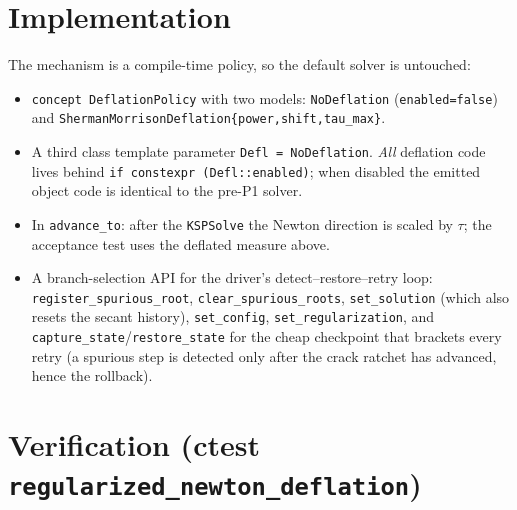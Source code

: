 \section{Implementation}

The mechanism is a compile-time policy, so the default solver is
untouched:
%
\begin{itemize}
  \item \texttt{concept DeflationPolicy} with two models: \texttt{NoDeflation}
        (\texttt{enabled=false}) and
        \texttt{ShermanMorrisonDeflation\{power,shift,tau\_max\}}.
  \item A third class template parameter
        \texttt{Defl = NoDeflation}. \emph{All} deflation code lives
        behind \texttt{if constexpr (Defl::enabled)}; when disabled the
        emitted object code is identical to the pre-P1 solver.
  \item In \texttt{advance\_to}: after the \texttt{KSPSolve} the Newton
        direction is scaled by \(\tau\); the acceptance test uses the
        deflated measure above.
  \item A branch-selection API for the driver's detect--restore--retry
        loop: \texttt{register\_spurious\_root},
        \texttt{clear\_spurious\_roots}, \texttt{set\_solution} (which
        also resets the secant history), \texttt{set\_config},
        \texttt{set\_regularization}, and
        \texttt{capture\_state}/\texttt{restore\_state} for the cheap
        checkpoint that brackets every retry (a spurious step is detected
        only after the crack ratchet has advanced, hence the rollback).
\end{itemize}

\section{Verification (ctest \texttt{regularized\_newton\_deflation})}

